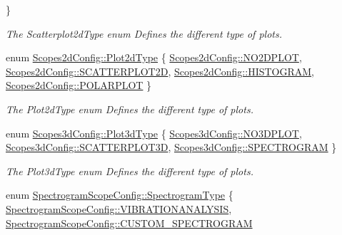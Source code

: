 \begin{DoxyCompactItemize}
 \}
\begin{DoxyCompactList}\small\item\em The Scatterplot2d\-Type enum Defines the different type of plots. \end{DoxyCompactList}\item 
enum \hyperlink{group___scope_plugin_ga0fad4d5fa165d3cf65c53a66501eb830}{Scopes2d\-Config\-::\-Plot2d\-Type} \{ \hyperlink{group___scope_plugin_gga0fad4d5fa165d3cf65c53a66501eb830a8a05ed744e85e763986c4c55bf561e67}{Scopes2d\-Config\-::\-N\-O2\-D\-P\-L\-O\-T}, 
\hyperlink{group___scope_plugin_gga0fad4d5fa165d3cf65c53a66501eb830a4cc6659e6c550e7a821db4ad6d3ed4dc}{Scopes2d\-Config\-::\-S\-C\-A\-T\-T\-E\-R\-P\-L\-O\-T2\-D}, 
\hyperlink{group___scope_plugin_gga0fad4d5fa165d3cf65c53a66501eb830a7f84951522a86b7b7a00ccc4fc58ad5a}{Scopes2d\-Config\-::\-H\-I\-S\-T\-O\-G\-R\-A\-M}, 
\hyperlink{group___scope_plugin_gga0fad4d5fa165d3cf65c53a66501eb830a6d9b3ec0d944281832f5d0b2d474106a}{Scopes2d\-Config\-::\-P\-O\-L\-A\-R\-P\-L\-O\-T}
 \}
\begin{DoxyCompactList}\small\item\em The Plot2d\-Type enum Defines the different type of plots. \end{DoxyCompactList}\item 
enum \hyperlink{group___scope_plugin_ga50e7b7155f87047a171af78191828496}{Scopes3d\-Config\-::\-Plot3d\-Type} \{ \hyperlink{group___scope_plugin_gga50e7b7155f87047a171af78191828496ae3b1069e4985d5e50337e7bd39969e74}{Scopes3d\-Config\-::\-N\-O3\-D\-P\-L\-O\-T}, 
\hyperlink{group___scope_plugin_gga50e7b7155f87047a171af78191828496a48fce9291e9e40ea180ad0d14f5bce39}{Scopes3d\-Config\-::\-S\-C\-A\-T\-T\-E\-R\-P\-L\-O\-T3\-D}, 
\hyperlink{group___scope_plugin_gga50e7b7155f87047a171af78191828496a84544a635d05fc1c4c6a7a273653d59e}{Scopes3d\-Config\-::\-S\-P\-E\-C\-T\-R\-O\-G\-R\-A\-M}
 \}
\begin{DoxyCompactList}\small\item\em The Plot3d\-Type enum Defines the different type of plots. \end{DoxyCompactList}\item 
enum \hyperlink{group___scope_plugin_ga4c227eca53956a4dda5ee8877b7868c6}{Spectrogram\-Scope\-Config\-::\-Spectrogram\-Type} \{ \hyperlink{group___scope_plugin_gga4c227eca53956a4dda5ee8877b7868c6a1412daaa24267bf3b82a82d8b8427238}{Spectrogram\-Scope\-Config\-::\-V\-I\-B\-R\-A\-T\-I\-O\-N\-A\-N\-A\-L\-Y\-S\-I\-S}, 
\hyperlink{group___scope_plugin_gga4c227eca53956a4dda5ee8877b7868c6a7f0d2eab37446fb5b0e0136911fa069f}{Spectrogram\-Scope\-Config\-::\-C\-U\-S\-T\-O\-M\-\_\-\-S\-P\-E\-C\-T\-R\-O\-G\-R\-A\-M}

\end{DoxyCompactItemize}
